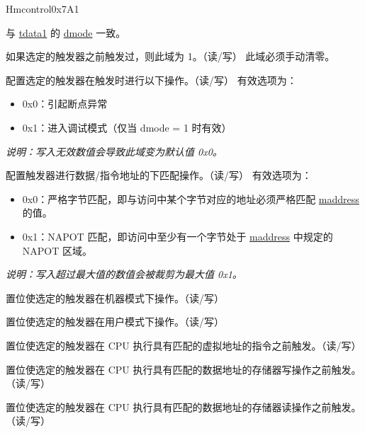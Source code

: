 \begin{register}{H}{mcontrol}{0x7A1}\label{regdesc:MCONTROL}
%
%
%
%
%
%
%
%
%
%
%
%
%
%
\regnewline%
\begin{regdesc}\begin{reglist}
\label{fielddesc:MCONTROLDMODE}\item [dmode] 与 \hyperref[regdesc:TDATA1]{tdata1} 的 \hyperref[fielddesc:TDATA1DMODE]{dmode} 一致。
\label{fielddesc:MCONTROLHIT}\item [hit] 如果选定的触发器之前触发过，则此域为 1。（读/写） \newline 此域必须手动清零。
\label{fielddesc:MCONTROLACTION}\item [action] 配置选定的触发器在触发时进行以下操作。（读/写）
\newline 有效选项为：
\begin{itemize}
    \setlength\itemsep{-1em}
    \item 0x0：引起断点异常
    \item 0x1：进入调试模式（仅当 dmode = 1 时有效）
\end{itemize}
\textit{说明：写入无效数值会导致此域变为默认值 0x0。}
\label{fielddesc:MCONTROLMATCH}\item [match] 配置触发器进行数据/指令地址的下匹配操作。（读/写）
\newline 有效选项为：
\begin{itemize}
    \setlength\itemsep{-1em}
    \item 0x0：严格字节匹配，即与访问中某个字节对应的地址必须严格匹配 \hyperref[regdesc:MADDRESS]{maddress} 的值。
    \item 0x1：NAPOT 匹配，即访问中至少有一个字节处于  \hyperref[regdesc:MADDRESS]{maddress} 中规定的 NAPOT 区域。
\end{itemize}
\textit{说明：写入超过最大值的数值会被裁剪为最大值 0x1。}
\label{fielddesc:MCONTROLM}\item [m] 置位使选定的触发器在机器模式下操作。（读/写）
\label{fielddesc:MCONTROLU}\item [u] 置位使选定的触发器在用户模式下操作。（读/写）
\label{fielddesc:MCONTROLEXECUTE}\item [execute] 置位使选定的触发器在 CPU 执行具有匹配的虚拟地址的指令之前触发。（读/写）
\label{fielddesc:MCONTROLSTORE}\item [store] 置位使选定的触发器在 CPU 执行具有匹配的数据地址的存储器写操作之前触发。（读/写）
\label{fielddesc:MCONTROLLOAD}\item [load] 置位使选定的触发器在 CPU 执行具有匹配的数据地址的存储器读操作之前触发。（读/写）
\end{reglist}\end{regdesc}
\end{register}

